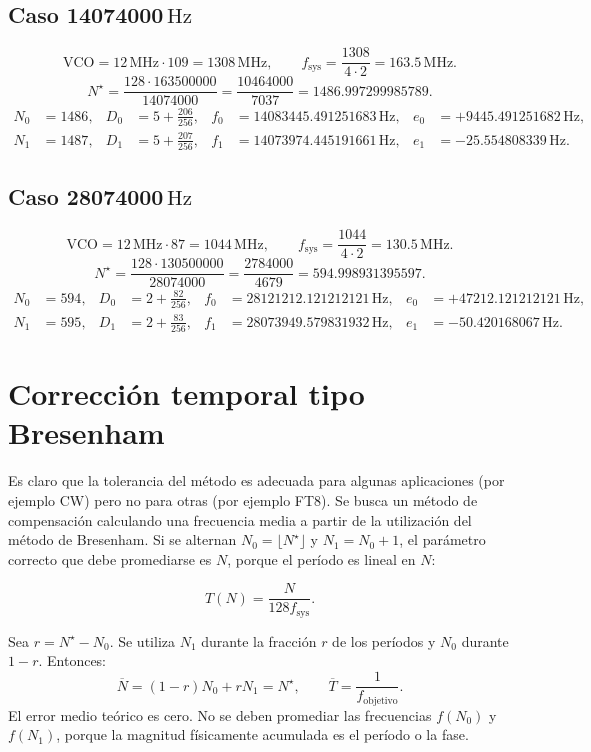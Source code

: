 \documentclass[10pt,a4paper]{article}
\newcommand{\num}[1]{#1}
\newcommand{\SI}[2]{#1\,\ensuremath{\mathrm{#2}}}
\newcommand{\mega}{M}
\newcommand{\hertz}{Hz}
\begin{document}
\subsection{Caso \SI{14074000}{\hertz}}
\[
\mathrm{VCO}=\SI{12}{\mega\hertz}\cdot109=\SI{1308}{\mega\hertz},
\qquad f_{\mathrm{sys}}=\frac{1308}{4\cdot2}=\SI{163.5}{\mega\hertz}.
\]
\[
N^\star=\frac{128\cdot\num{163500000}}{\num{14074000}}
=\frac{10464000}{7037}=1486.997299985789.
\]
\[
\begin{aligned}
N_0&=1486,&D_0&=5+\frac{206}{256},&
f_0&=\SI{14083445.491251683}{\hertz},&
e_0&=+\SI{9445.491251682}{\hertz},\\
N_1&=1487,&D_1&=5+\frac{207}{256},&
f_1&=\SI{14073974.445191661}{\hertz},&
e_1&=-\SI{25.554808339}{\hertz}.
\end{aligned}
\]

\subsection{Caso \SI{28074000}{\hertz}}
\[
\mathrm{VCO}=\SI{12}{\mega\hertz}\cdot87=\SI{1044}{\mega\hertz},
\qquad f_{\mathrm{sys}}=\frac{1044}{4\cdot2}=\SI{130.5}{\mega\hertz}.
\]
\[
N^\star=\frac{128\cdot\num{130500000}}{\num{28074000}}
=\frac{2784000}{4679}=594.998931395597.
\]
\[
\begin{aligned}
N_0&=594,&D_0&=2+\frac{82}{256},&
f_0&=\SI{28121212.121212121}{\hertz},&
e_0&=+\SI{47212.121212121}{\hertz},\\
N_1&=595,&D_1&=2+\frac{83}{256},&
f_1&=\SI{28073949.579831932}{\hertz},&
e_1&=-\SI{50.420168067}{\hertz}.
\end{aligned}
\]

\clearpage
\section{Corrección temporal tipo Bresenham}
Es claro que la tolerancia del método es adecuada para algunas aplicaciones
(por ejemplo CW) pero no para otras (por ejemplo FT8).
Se busca un método de compensación calculando una frecuencia media a partir
de la utilización del método de Bresenham.
Si se alternan \(N_0=\lfloor N^\star\rfloor\) y \(N_1=N_0+1\), el
parámetro correcto que debe promediarse es \(N\), porque el período es
lineal en \(N\):
\begin{technicalbox}
\[
T(N)=\frac{N}{128f_{\mathrm{sys}}}.
\]
\end{technicalbox}
Sea \(r=N^\star-N_0\). Se utiliza \(N_1\) durante la fracción \(r\) de los
períodos y \(N_0\) durante \(1-r\). Entonces:
\[
\overline N=(1-r)N_0+rN_1=N^\star,\qquad
\overline T=\frac{1}{f_{\mathrm{objetivo}}}.
\]
El error medio teórico es cero. No se deben promediar las frecuencias
\(f(N_0)\) y \(f(N_1)\), porque la magnitud físicamente acumulada es el
período o la fase.
\end{document}
